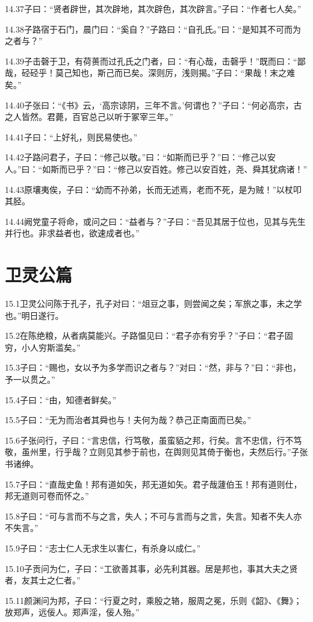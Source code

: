 \documentclass[a4paper,12pt,UTF8,twoside]{ctexbook}
\begin{document}
14.37子曰：“贤者辟世，其次辟地，其次辟色，其次辟言。”子曰：“作者七人矣。”

14.38子路宿于石门，晨门曰：“奚自？”子路曰：“自孔氏。”曰：“是知其不可而为之者与？”

14.39子击磬于卫，有荷蒉而过孔氏之门者，曰：“有心哉，击磬乎！”既而曰：“鄙哉，硁硁乎！莫己知也，斯己而已矣。深则厉，浅则揭。”子曰：“果哉！末之难矣。”

14.40子张曰：“《书》云，‘高宗谅阴，三年不言。’何谓也？”子曰：“何必高宗，古之人皆然。君薨，百官总己以听于冢宰三年。”

14.41子曰：“上好礼，则民易使也。”

14.42子路问君子，子曰：“修己以敬。”曰：“如斯而已乎？”曰：“修己以安人。”曰：“如斯而已乎？”曰：“修己以安百姓。修己以安百姓，尧、舜其犹病诸！”

14.43原壤夷俟，子曰：“幼而不孙弟，长而无述焉，老而不死，是为贼！”以杖叩其胫。

14.44阙党童子将命，或问之曰：“益者与？”子曰：“吾见其居于位也，见其与先生并行也。非求益者也，欲速成者也。”

\chapter{卫灵公篇}
15.1卫灵公问陈于孔子，孔子对曰：“俎豆之事，则尝闻之矣；军旅之事，未之学也。”明日遂行。

15.2在陈绝粮，从者病莫能兴。子路愠见曰：“君子亦有穷乎？”子曰：“君子固穷，小人穷斯滥矣。”

15.3子曰：“赐也，女以予为多学而识之者与？”对曰：“然，非与？”曰：“非也，予一以贯之。”

15.4子曰：“由，知德者鲜矣。”

15.5子曰：“无为而治者其舜也与！夫何为哉？恭己正南面而已矣。”

15.6子张问行，子曰：“言忠信，行笃敬，虽蛮貊之邦，行矣。言不忠信，行不笃敬，虽州里，行乎哉？立则见其参于前也，在舆则见其倚于衡也，夫然后行。”子张书诸绅。

15.7子曰：“直哉史鱼！邦有道如矢，邦无道如矢。君子哉蘧伯玉！邦有道则仕，邦无道则可卷而怀之。”

15.8子曰：“可与言而不与之言，失人；不可与言而与之言，失言。知者不失人亦不失言。”

15.9子曰：“志士仁人无求生以害仁，有杀身以成仁。”

15.10子贡问为仁，子曰：“工欲善其事，必先利其器。居是邦也，事其大夫之贤者，友其士之仁者。”

15.11颜渊问为邦，子曰：“行夏之时，乘殷之辂，服周之冕，乐则《韶》、《舞》；放郑声，远佞人。郑声淫，佞人殆。”
\end{document}

